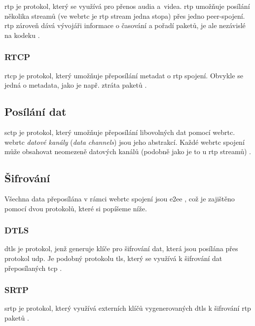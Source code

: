\gls{rtp} je protokol, který se využívá pro přenos audia a~videa. \gls{rtp}
umožňuje posílání několika streamů (ve \gls{webrtc} je \gls{rtp} stream jedna
stopa) přes jedno peer-spojení. \gls{rtp} zároveň dává vývojáři informace o
časování a pořadí paketů, je ale nezávislé na kodeku
\parencite{WebRTCForTheCurious}.

\subsubsection{RTCP}\label{rtcp}

\gls{rtcp} je protokol, který umožňuje přeposílání metadat o \gls{rtp} spojení.
Obvykle se jedná o metadata, jako je např. ztráta paketů
\parencite{WebRTCForTheCurious}.

\subsection{Posílání dat}\label{sctp}

\gls{sctp} je protokol, který umožňuje přeposílání libovolných dat pomocí
\gls{webrtc}. \gls{webrtc} \textit{datové kanály} (\textit{data channels}) jsou
jeho abstrakcí. Každé \gls{webrtc} spojení může obsahovat neomezeně datových
kanálů (podobně jako je to u \gls{rtp} streamů) \parencite{WebRTCForTheCurious}.

\subsection{Šifrování}

Všechna data přeposílána v rámci \gls{webrtc} spojení jsou \gls{e2ee}
\parencite{WebRTCForTheCurious}, což je zajištěno pomocí dvou protokolů, které
si popíšeme níže.

\subsubsection{DTLS}\label{dtls}

\gls{dtls} je protokol, jenž generuje klíče pro šifrování dat, která jsou
posílána přes protokol \gls{udp}. Je podobný protokolu \gls{tls}, který se
využívá k šifrování dat přeposílaných \gls{tcp} \parencite{WebRTCForTheCurious}.

\subsubsection{SRTP}\label{srtp}

\gls{srtp} je protokol, který využívá externích klíčů vygenerovaných \gls{dtls}
k šifrování \gls{rtp} paketů \parencite{WebRTCForTheCurious}.

